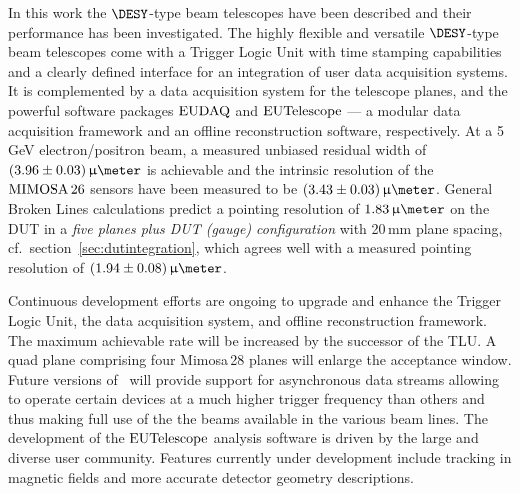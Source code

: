 

In this work the $\DESY$-type beam telescopes have been described and their performance has been investigated. 
The highly flexible and versatile $\DESY$-type beam telescopes come with a Trigger Logic Unit with time stamping capabilities and a clearly defined interface for an integration of user data acquisition systems.
It is complemented by a data acquisition system for the telescope planes, and the powerful software packages $\textrm{EUDAQ}$ and $\textrm{EUTelescope}$
 ---  a modular data acquisition framework and an offline reconstruction software, respectively. 
At a 5\,GeV electron/positron beam, a measured unbiased residual width of $(3.96 \pm 0.03)\,\upmu\meter$ is achievable
 and the intrinsic resolution of the $\textrm{MIMOSA\,26}$ sensors have been measured to be $(3.43 \pm 0.03)\,\upmu\meter$.
General Broken Lines calculations predict a pointing resolution of $1.83\,\upmu\meter$ on the DUT in a \textit{five planes plus DUT (gauge) configuration} with 20\,mm plane spacing,
 cf.~section~\ref{sec:dutintegration},
 which agrees well with a measured pointing resolution of $(1.94 \pm 0.08)\,\upmu\meter$.

Continuous development efforts are ongoing to upgrade and enhance the Trigger Logic Unit, the data acquisition system, and offline reconstruction framework.  
The maximum achievable rate will be increased by the successor of the TLU. 
A quad plane comprising four Mimosa\,28 planes will enlarge the acceptance window. 
Future versions of \eudaq\ will provide support for asynchronous data streams allowing to operate certain devices at a much higher trigger frequency than others
 and thus making full use of the the beams available in the various beam lines.
The development of the $\textrm{EUTelescope}$ analysis software is driven by the large and diverse user community. 
Features currently under development include tracking in magnetic fields and more accurate detector geometry descriptions. 
